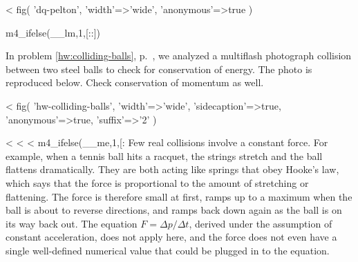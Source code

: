 <%
  fig(
    'dq-pelton',
    {
      'width'=>'wide',
      'anonymous'=>true
    }
  )

m4_ifelse(__lm,1,[:\pagebreak:])

\begin{dq}\label{dq:colliding-balls-p}
In problem \ref{hw:colliding-balls}, p.~\pageref{hw:colliding-balls}, we analyzed a multiflash photograph collision between two
steel balls to check for conservation of energy. The photo is reproduced below. Check conservation of momentum as well.
\end{dq}

<%
  fig(
    'hw-colliding-balls',
    {
      'width'=>'wide',
      'sidecaption'=>true,
      'anonymous'=>true,
      'suffix'=>'2'
    }
  )

<%
<%
<%
m4_ifelse(__me,1,[:
Few real collisions involve a constant force. For example,
when a tennis ball hits a racquet, the strings stretch and
the ball flattens dramatically. They are both acting like
springs that obey Hooke's law, which says that the force is
proportional to the amount of stretching or flattening. The
force is therefore small at first, ramps up to a maximum
when the ball is about to reverse directions, and ramps back
down again as the ball is on its way back out. The equation
$F=\Delta p/\Delta t$, derived under the assumption of
constant acceleration, does not apply here, and the force
does not even have a single well-defined numerical value
that could be plugged in to the equation.

